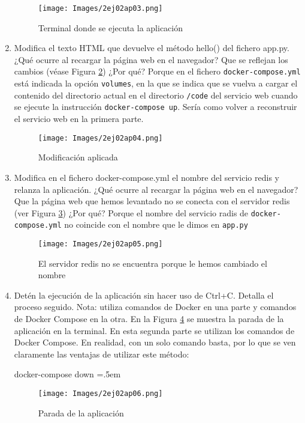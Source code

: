 \documentclass[12pt,a4paper]{article}
\newenvironment{lcverbatim}
 {\SaveVerbatim{cverb}}
 {\endSaveVerbatim
  \flushleft\fboxrule=0pt\fboxsep=.5em
  \colorbox{cverbbg}{%
    \makebox[\dimexpr\linewidth-2\fboxsep][l]{\BUseVerbatim{cverb}}%
  }
  \endflushleft
}
\begin{document}
\begin{enumerate}
\begin{figure}[h]
    \centering
    \texttt{[image: Images/2ej02ap03.png]}
    \caption{Terminal donde se ejecuta la aplicación}
    \label{fig:2ej02ap03}
\end{figure}

\item Modifica el texto HTML que devuelve el método hello() del fichero app.py. ¿Qué ocurre al
recargar la página web en el navegador? Que se reflejan los cambios (véase Figura \ref{fig:2ej02ap04}) ¿Por qué? Porque en el fichero \verb|docker-compose.yml| está indicada la opción \verb|volumes|, en la que se indica que se vuelva a cargar el contenido del directorio actual en el directorio \verb|/code| del servicio web cuando se ejecute la instrucción \verb|docker-compose up|. Sería como volver a reconstruir el servicio web en la primera parte.

\begin{figure}[h]
    \centering
    \texttt{[image: Images/2ej02ap04.png]}
    \caption{Modificación aplicada}
    \label{fig:2ej02ap04}
\end{figure}

\newpage
\item Modifica en el fichero docker-compose.yml el nombre del servicio redis y relanza la aplicación. ¿Qué ocurre al recargar la página web en el navegador? Que la página web que hemos levantado no se conecta con el servidor redis (ver Figura \ref{fig:2ej02ap05}) ¿Por qué? Porque el nombre del servicio radis de \verb|docker-compose.yml| no coincide con el nombre que le dimos en \verb|app.py|

\begin{figure}[h]
    \centering
    \texttt{[image: Images/2ej02ap05.png]}
    \caption{El servidor redis no se encuentra porque le hemos cambiado el nombre}
    \label{fig:2ej02ap05}
\end{figure}

\item Detén la ejecución de la aplicación sin hacer uso de Ctrl+C. Detalla el proceso seguido. Nota:
utiliza comandos de Docker en una parte y comandos de Docker Compose en la otra. En la Figura \ref{fig:2ej02ap06} se muestra la parada de la aplicación en la terminal. En esta segunda parte se utilizan los comandos de Docker Compose. En realidad, con un solo comando basta, por lo que se ven claramente las ventajas de utilizar este método:

\begin{lcverbatim}
docker-compose down
\end{lcverbatim}

\begin{figure}[h]
    \centering
    \texttt{[image: Images/2ej02ap06.png]}
    \caption{Parada de la aplicación}
    \label{fig:2ej02ap06}
\end{figure}

\end{enumerate}{}



\newpage
\printbibliography
\end{document}
